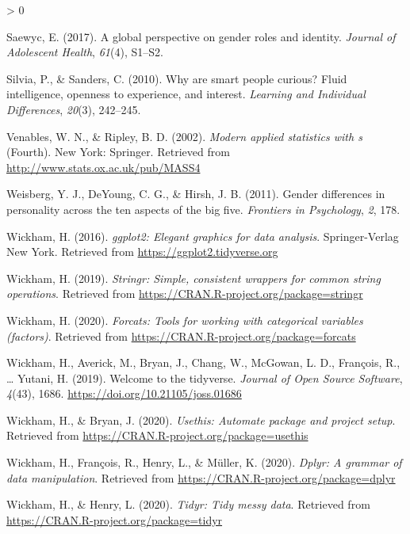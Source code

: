 \documentclass[
  english,
  man, fleqn, noextraspace]{apa6}
\newlength{\cslhangindent}
\newenvironment{CSLReferences}[2] %
 {%
  \setlength{\parindent}{0pt}
  \ifodd #1 \everypar{\setlength{\hangindent}{\cslhangindent}}\ignorespaces\fi
  \ifnum #2 > 0
  \setlength{\parskip}{#2\baselineskip}
  \fi
 }%
 {}
\begin{document}
\begin{CSLReferences}{1}{0}
\leavevmode\hypertarget{ref-saewyc2017}{}%
Saewyc, E. (2017). A global perspective on gender roles and identity. \emph{Journal of Adolescent Health}, \emph{61}(4), S1--S2.

\leavevmode\hypertarget{ref-silvia2010}{}%
Silvia, P., \& Sanders, C. (2010). Why are smart people curious? Fluid intelligence, openness to experience, and interest. \emph{Learning and Individual Differences}, \emph{20}(3), 242--245.

\leavevmode\hypertarget{ref-R-MASS}{}%
Venables, W. N., \& Ripley, B. D. (2002). \emph{Modern applied statistics with s} (Fourth). New York: Springer. Retrieved from \url{http://www.stats.ox.ac.uk/pub/MASS4}

\leavevmode\hypertarget{ref-weisberg2011}{}%
Weisberg, Y. J., DeYoung, C. G., \& Hirsh, J. B. (2011). Gender differences in personality across the ten aspects of the big five. \emph{Frontiers in Psychology}, \emph{2}, 178.

\leavevmode\hypertarget{ref-R-ggplot2}{}%
Wickham, H. (2016). \emph{ggplot2: Elegant graphics for data analysis}. Springer-Verlag New York. Retrieved from \url{https://ggplot2.tidyverse.org}

\leavevmode\hypertarget{ref-R-stringr}{}%
Wickham, H. (2019). \emph{Stringr: Simple, consistent wrappers for common string operations}. Retrieved from \url{https://CRAN.R-project.org/package=stringr}

\leavevmode\hypertarget{ref-R-forcats}{}%
Wickham, H. (2020). \emph{Forcats: Tools for working with categorical variables (factors)}. Retrieved from \url{https://CRAN.R-project.org/package=forcats}

\leavevmode\hypertarget{ref-R-tidyverse}{}%
Wickham, H., Averick, M., Bryan, J., Chang, W., McGowan, L. D., François, R., \ldots{} Yutani, H. (2019). Welcome to the {tidyverse}. \emph{Journal of Open Source Software}, \emph{4}(43), 1686. \url{https://doi.org/10.21105/joss.01686}

\leavevmode\hypertarget{ref-R-usethis}{}%
Wickham, H., \& Bryan, J. (2020). \emph{Usethis: Automate package and project setup}. Retrieved from \url{https://CRAN.R-project.org/package=usethis}

\leavevmode\hypertarget{ref-R-dplyr}{}%
Wickham, H., François, R., Henry, L., \& Müller, K. (2020). \emph{Dplyr: A grammar of data manipulation}. Retrieved from \url{https://CRAN.R-project.org/package=dplyr}

\leavevmode\hypertarget{ref-R-tidyr}{}%
Wickham, H., \& Henry, L. (2020). \emph{Tidyr: Tidy messy data}. Retrieved from \url{https://CRAN.R-project.org/package=tidyr}


\end{CSLReferences}
\end{document}
